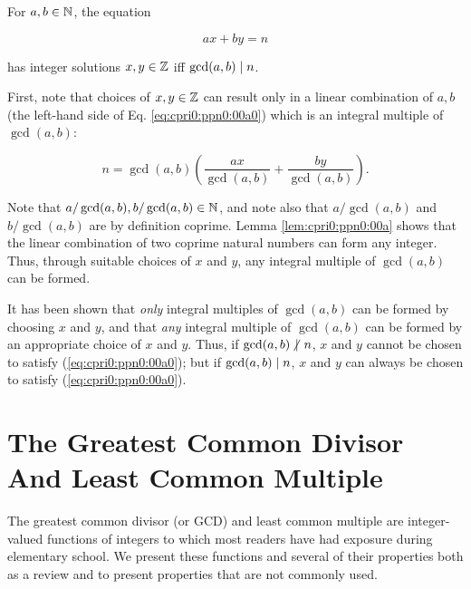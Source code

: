 \begin{vworktheoremstatement}
\label{thm:cpri0:ppn0:00a}
For $a, b \in {\mathbb{N}}$, the equation 

\begin{equation}
\label{eq:cpri0:ppn0:00a0}
ax + by = n
\end{equation}

has integer solutions $x,y \in {\mathbb{Z}}$ iff $\gcd(a,b) \mid n$.
\end{vworktheoremstatement}
\begin{vworktheoremproof}
First, note that choices of $x,y \in {\mathbb{Z}}$
can result only in a linear combination of $a, b$ (the
left-hand side of Eq. \ref{eq:cpri0:ppn0:00a0}) which is an
integral multiple of $\gcd(a,b)$:

\begin{equation}
\label{eq:cpri0:ppn0:00a1}
n = \gcd(a,b) \left( { \frac{ax}{\gcd(a,b)}  +  \frac{by}{\gcd(a,b)} } \right) .
\end{equation}

Note that $a/\gcd(a,b), b/\gcd(a,b) \in {\mathbb{N}}$, and note also that
$a/\gcd(a,b)$ and $b/\gcd(a,b)$ are by definition coprime.  Lemma
\ref{lem:cpri0:ppn0:00a} shows that
the linear combination of two coprime natural numbers can form
any integer.  Thus, through suitable choices of $x$ and $y$, any integral 
multiple of $\gcd(a,b)$ can be formed.

It has been shown that \emph{only} integral multiples of $\gcd(a,b)$ can
be formed by choosing $x$ and $y$, and that 
\emph{any} integral multiple of $\gcd(a,b)$ can
be formed by an appropriate choice of $x$ and $y$.  Thus,
if $\gcd(a,b) \hspace{-0.125em}\not\hspace{0.245em}\mid\hspace{0.135em} n$, $x$ and $y$ cannot be chosen
to satisfy (\ref{eq:cpri0:ppn0:00a0}); but if
$\gcd(a,b) \mid n$, $x$ and $y$ can always be chosen
to satisfy (\ref{eq:cpri0:ppn0:00a0}).
\end{vworktheoremproof}
\vworktheoremfooter{}


\section{The Greatest Common Divisor And Least Common Multiple}
\label{cpri0:gcd0}

The greatest common divisor
(or GCD) and least common multiple
are integer-valued functions of integers to which most readers 
have had exposure during elementary school.  We present these functions and
several of their properties both as a review and to present properties that
are not commonly used.

